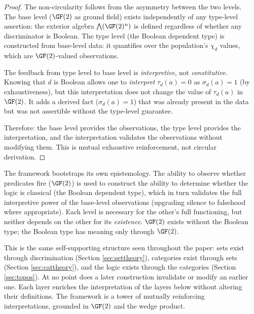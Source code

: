 \begin{proof}
The non-circularity follows from the asymmetry between the
two levels. The base level ($\GF(2)$ as ground field) exists
independently of any type-level assertion: the exterior
algebra $\bigwedge(\GF(2)^n)$ is defined regardless of
whether any discriminator is Boolean. The type level
(the Boolean dependent type) is constructed from base-level
data: it quantifies over the population's $\chi_d$ values,
which are $\GF(2)$-valued observations.

The feedback from type level to base level is
\emph{interpretive}, not \emph{constitutive}. Knowing that
$d$ is Boolean allows one to \emph{interpret} $\tau_d(a) = 0$
as $\sigma_d(a) = 1$ (by exhaustiveness), but this
interpretation does not change the value of $\tau_d(a)$
in $\GF(2)$. It adds a derived fact ($\sigma_d(a) = 1$)
that was already present in the data but was not
assertible without the type-level guarantee.

Therefore: the base level provides the observations, the
type level provides the interpretation, and the
interpretation validates the observations without
modifying them. This is mutual exhaustive reinforcement,
not circular derivation.
\end{proof}

\begin{remark}
The framework bootstraps its own epistemology. The
ability to observe whether predicates fire ($\GF(2)$) is
used to construct the ability to determine whether the
logic is classical (the Boolean dependent type), which
in turn validates the full interpretive power of the
base-level observations (upgrading silence to falsehood
where appropriate). Each level is necessary for the
other's full functioning, but neither depends on the
other for its \emph{existence}. $\GF(2)$ exists without
the Boolean type; the Boolean type has meaning only
through $\GF(2)$.

This is the same self-supporting structure seen throughout
the paper: sets exist through discrimination
(Section \ref{sec:settheory}), categories exist through
sets (Section \ref{sec:cattheory}), and the logic exists
through the categories (Section \ref{sec:topos}). At no
point does a later construction invalidate or modify an
earlier one. Each layer enriches the interpretation of
the layers below without altering their definitions. The
framework is a tower of mutually reinforcing
interpretations, grounded in $\GF(2)$ and the wedge
product.
\end{remark}

